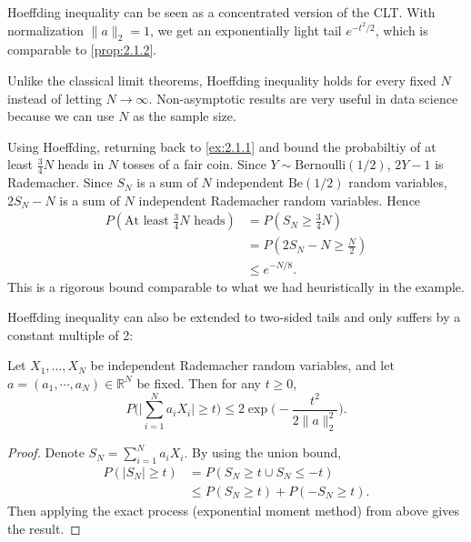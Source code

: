 \begin{remark}
Hoeffding inequality can be seen as a concentrated version of the CLT. With normalization $\|a\|_2 = 1$, 
we get an exponentially light tail $e^{-t^2 / 2}$, which is comparable to \cref{prop:2.1.2}.
\end{remark}

\begin{remark}
Unlike the classical limit theorems, Hoeffding inequality holds for every fixed $N$ instead of letting 
$N \to \infty$. Non-asymptotic results are very useful in data science because we can use $N$ as the 
sample size.
\end{remark}

\begin{remark}
Using Hoeffding, returning back to \cref{ex:2.1.1} and bound the probabiltiy of at least $\frac{3}{4}N$ 
heads in $N$ tosses of a fair coin. Since $Y \sim \text{Bernoulli}(1/2)$, $2Y - 1$ is Rademacher. Since 
$S_N$ is a sum of $N$ independent $\text{Be}(1/2)$ random variables, $2S_N - N$ is a sum of $N$ 
independent Rademacher random variables. Hence 
\begin{align*}
	P(\text{At least } \frac{3}{4}N \text{ heads}) 
	&= P(S_N \geq \frac{3}{4}N) \\
	&= P(2S_N - N \geq \frac{N}{2}) \\
	&\leq e^{-N/8}.
\end{align*}
This is a rigorous bound comparable to what we had heuristically in the example.
\end{remark}

Hoeffding inequality can also be extended to two-sided tails and only suffers by a constant multiple 
of 2: 
\begin{theorem}Let $X_1, \dots, X_N$ be independent Rademacher random 
variables, and let $a = (a_1, \cdots, a_N) \in \mathbb{R}^N$ be fixed. Then for any $t \geq 0$, 
\[ P \biggl( \bigg| \sum_{i = 1}^{N} a_iX_i \bigg| \geq t \biggr) 
\leq 2\exp{\biggl( -\frac{t^2}{2\|a\|_2^2} \biggr)}. \]
\end{theorem}

\begin{proof}
Denote $S_N = \sum_{i = 1}^{N} a_iX_i$. By using the union bound,
\begin{align*}
	P(|S_N| \geq t) 
	&= P(S_N \geq t \cup S_N \leq -t) \\
	&\leq P(S_N \geq t) + P(-S_N \geq t).
\end{align*}
Then applying the exact process (exponential moment method) from above gives the result.
\end{proof}

